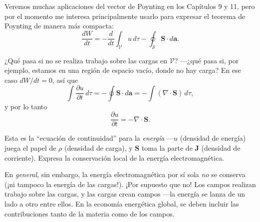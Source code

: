 \documentclass[12pt,a4paper]{report}
\begin{document}
	Veremos muchas aplicaciones del vector de Poynting en los Capítulos 9 y 11, pero por el momento me interesa principalmente usarlo para expresar el teorema de Poynting de manera más compacta:
	\begin{equation}
		\frac{dW}{dt} = -\frac{d}{dt} \int_{\mathcal{V}} u \, d\tau - \oint_{\mathcal{S}} \mathbf{S} \cdot d\mathbf{a}. \tag{8.11}
	\end{equation}
	
	¿Qué pasa si no se realiza trabajo sobre las cargas en $\mathcal{V}$? ---¿qué pasa si, por ejemplo, estamos en una región de espacio vacío, donde no hay carga? En ese caso $dW/dt = 0$, así que
	\begin{equation*}
		\int \frac{\partial u}{\partial t} \, d\tau = -\oint \mathbf{S} \cdot d\mathbf{a} = -\int (\nabla \cdot \mathbf{S}) \, d\tau,
	\end{equation*}
	y por lo tanto
	\begin{equation}
		\frac{\partial u}{\partial t} = -\nabla \cdot \mathbf{S}. \tag{8.12}
	\end{equation}
	
	Esta es la ``ecuación de continuidad'' para la \textit{energía} ---$u$ (densidad de energía) juega el papel de $\rho$ (densidad de carga), y $\mathbf{S}$ toma la parte de $\mathbf{J}$ (densidad de corriente). Expresa la conservación local de la energía electromagnética.
	
	En \textit{general}, sin embargo, la energía electromagnética por sí sola \textit{no} se conserva (¡ni tampoco la energía de las cargas!). ¡Por supuesto que no! Los campos realizan trabajo sobre las cargas, y las cargas crean campos ---la energía se lanza de un lado a otro entre ellos. En la economía energética global, se deben incluir las contribuciones tanto de la materia como de los campos.
	
	\printbibliography[title={Bibliografía}]
\end{document}
